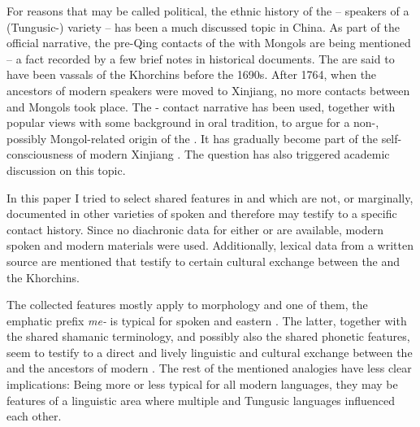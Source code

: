 \documentclass[output=paper,colorlinks,citecolor=brown]{langscibook}
\begin{document}
For reasons that may be called political, the ethnic history of the  – speakers of a  (Tungusic-) variety – has been a much discussed topic in China. As part of the official narrative, the pre-Qing contacts of the  with  Mongols are being mentioned – a fact recorded by a few brief notes in historical documents. The  are said to have been vassals of the Khorchins before the 1690s. After 1764, when the ancestors of modern  speakers were moved to Xinjiang, no more contacts between  and  Mongols took place. The - contact narrative has been used, together with popular views with some background in oral tradition, to argue for a non-, possibly Mongol-related origin of the . It has gradually become part of the self-consciousness of modern Xinjiang . The question has also triggered academic discussion on this topic. 

In this paper I tried to select shared features in  and  which are not, or marginally, documented in other varieties of spoken  and therefore may testify to a specific contact history. Since no diachronic data for either  or  are available, modern spoken  and modern  materials were used. Additionally, lexical data from a written source are mentioned that testify to certain cultural exchange between the  and the Khorchins.

The collected features mostly apply to morphology and one of them, the emphatic prefix \textit{me-} is typical for spoken  and eastern . The latter, together with the shared shamanic terminology, and possibly also the shared phonetic features, seem to testify to a direct and lively linguistic and cultural exchange between the  and the ancestors of modern . The rest of the mentioned analogies have less clear implications: Being more or less typical for all modern  languages, they may be features of a linguistic area where multiple  and Tungusic languages influenced each other.
\end{document}
